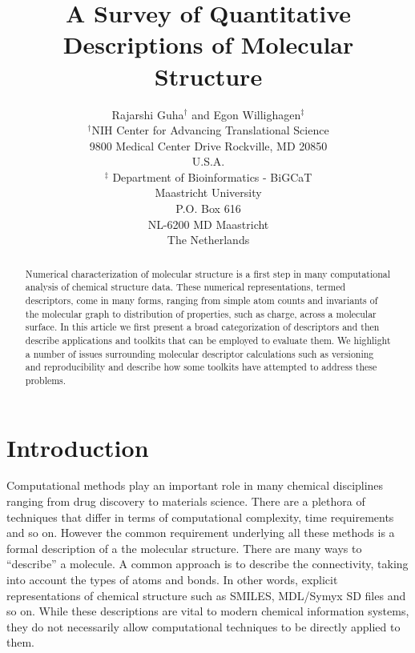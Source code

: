 \documentclass[letterpaper, 12pt]{article}
\begin{document}
\title{A Survey of Quantitative Descriptions of Molecular Structure}
\author{Rajarshi Guha${}^{\dagger}$ and Egon Willighagen${}^{\ddagger}$\\
${}^{\dagger}$NIH Center for Advancing Translational Science\\9800 Medical
Center Drive  Rockville, MD 20850 \\U.S.A.\\
${}^{\ddagger}$ Department of Bioinformatics - BiGCaT\\Maastricht University\\P.O. Box 616\\NL-6200 MD Maastricht\\The Netherlands
}
\date{}

\maketitle
\begin{abstract}
  Numerical characterization of molecular structure is a first step in
  many computational analysis of chemical structure data. These numerical
  representations, termed descriptors, come in many forms, ranging
  from simple atom counts and invariants of the molecular graph to
  distribution of properties, such as charge, across a molecular
  surface. In this article we first present a broad categorization of
  descriptors and then describe applications and toolkits that can be
  employed to evaluate them. We highlight a number of issues
  surrounding molecular descriptor calculations such as versioning and
  reproducibility and describe how some toolkits have attempted to
  address these problems.
\end{abstract}

\section{Introduction}

Computational methods play an important role in many chemical
disciplines ranging from drug discovery to materials science.
There are a plethora of techniques that differ in terms of
computational complexity, time requirements and so on. However the
common requirement underlying all these methods is a formal
description of a the molecular structure. There are many
ways to ``describe'' a molecule. A common approach is to describe the
connectivity, taking into account the types of atoms and bonds. In
other words, explicit representations of chemical structure such as
SMILES, MDL/Symyx SD files and so on. While these descriptions are vital to
modern chemical information systems, they do not necessarily allow
computational techniques to be directly applied to them.
\end{document}
